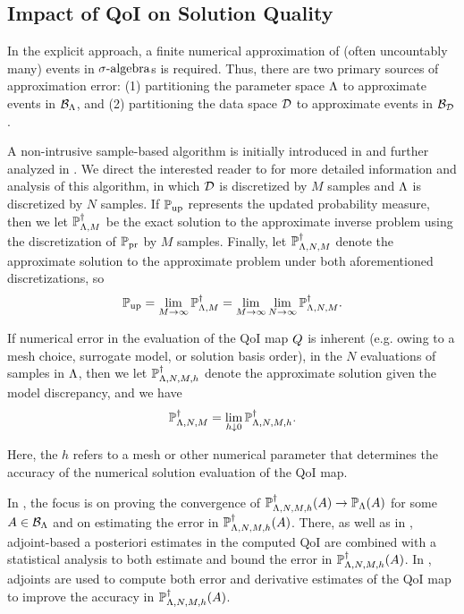 \subsection{Impact of QoI on Solution Quality }\label{sec:impact}

In the explicit approach, a finite numerical approximation of (often uncountably many) events in $\sigma\text{-algebra}$s is required.
Thus, there are two primary sources of approximation error: (1) partitioning the parameter space ${\Lambda}$ to approximate events in $\mathcal{B}_{{\Lambda}}$, and (2) partitioning the data space $\mathcal{D}$ to approximate events in $\mathcal{B}_{\mathcal{D}}$.
 
A non-intrusive sample-based algorithm is initially introduced in \cite{BET+14} and further analyzed in \cite{BET+14-arxiv}. 
We direct the interested reader to \cite{BET+14-arxiv} for more detailed information and analysis of this algorithm, in which $\mathcal{D}$ is discretized by $M$ samples and ${\Lambda}$ is discretized by $N$ samples. 
If $\operatorname*{\mathbb{P}_{up}}$ represents the updated probability measure, then we let $\mathbb{P}_{{\Lambda},M}^\dagger$ be the exact solution to the approximate inverse problem using the discretization of $\operatorname*{\mathbb{P}_{pr}}$ by $M$ samples.
Finally, let $\mathbb{P}_{{\Lambda},N,M}^\dagger$ denote the approximate solution to the approximate problem under both aforementioned discretizations, so 
\[
\operatorname*{\mathbb{P}_{up}} = \lim\limits_{M\to\infty} \mathbb{P}_{{\Lambda},M}^\dagger = \lim\limits_{M\to\infty} \lim\limits_{N\to\infty} \mathbb{P}_{{\Lambda},N,M}^\dagger.
\]

If numerical error in the evaluation of the QoI map $Q$ is inherent (e.g. owing to a mesh choice, surrogate model, or solution basis order), in the $N$ evaluations of samples in ${\Lambda}$, then we let $\mathbb{P}_{{\Lambda},N,M,h}^\dagger$ denote the approximate solution given the model discrepancy, and we have
\[
\mathbb{P}_{{\Lambda},N,M}^\dagger= \lim\limits_{h \downarrow 0} \mathbb{P}_{{\Lambda},N,M,h}^\dagger.
\]

Here, the $h$ refers to a mesh or other numerical parameter that determines the accuracy of the numerical solution evaluation of the QoI map.
 

In \cite{BM17}, the focus is on proving the convergence of $\mathbb{P}_{{\Lambda},N,M,h}^\dagger(A) \to \mathbb{P}_{{\Lambda}} (A)$ for some $A\in \mathcal{B}_{{\Lambda}}$ and on estimating the error in $\mathbb{P}_{{\Lambda},N,M,h}^\dagger(A)$.
There, as well as in \cite{JWW17}, adjoint-based a posteriori estimates in the computed QoI are combined with a statistical analysis to both estimate and bound the error in $\mathbb{P}_{{\Lambda},N,M,h}^\dagger (A)$.
In \cite{BM17}, adjoints are used to compute both error and derivative estimates of the QoI map to improve the accuracy in $\mathbb{P}_{{\Lambda},N,M,h}^\dagger (A)$.

